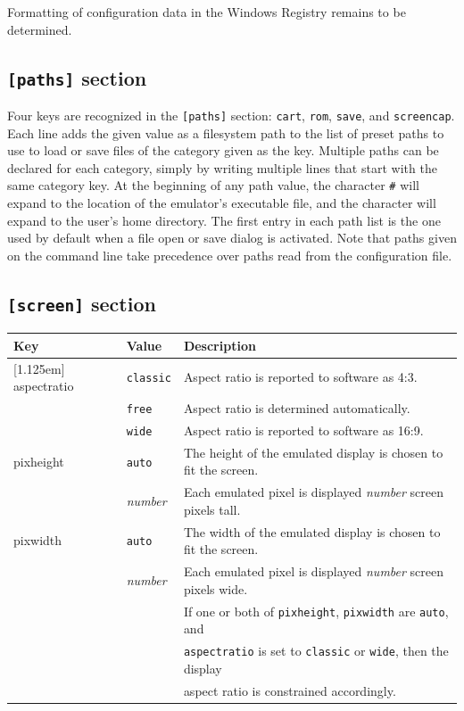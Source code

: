 \documentclass[12pt]{{memoir}}
\newcommand\Hline{%
\hline\raisebox{0pt}[1.125em]{}}
\begin{document}
Formatting of configuration data in the Windows Registry remains to be determined.

\subsection{\texttt{[paths]} section}

Four keys are recognized in the \texttt{[paths]} section: \texttt{cart}, \texttt{rom}, \texttt{save}, and \texttt{screencap}. Each line adds the given value as a filesystem path to the list of preset paths to use to load or save files of the category given as the key. Multiple paths can be declared for each category, simply by writing multiple lines that start with the same category key. At the beginning of any path value, the character \texttt{\#} will expand to the location of the emulator's executable file, and the character \texttt{\raisebox{-.25em}{\textasciitilde}} will expand to the user's home directory. The first entry in each path list is the one used by default when a file open or save dialog is activated. Note that paths given on the command line take precedence over paths read from the configuration file.

\subsection{\texttt{[screen]} section}

\begin{center}\begin{tabular}{>{\ttfamily}lll}
\textrm{Key} & Value & Description \\
\Hline
aspectratio & \texttt{classic} & Aspect ratio is reported to software as 4:3.\\
& \texttt{free} & Aspect ratio is determined automatically.\\
& \texttt{wide} & Aspect ratio is reported to software as 16:9.\\
pixheight & \texttt{auto} & The height of the emulated display is chosen to fit the screen.\\
& \textit{number} & Each emulated pixel is displayed \textit{number} screen pixels tall.\\
pixwidth & \texttt{auto} & The width of the emulated display is chosen to fit the screen.\\
& \textit{number} & Each emulated pixel is displayed \textit{number} screen pixels wide.\\
& & If one or both of \texttt{pixheight}, \texttt{pixwidth} are \texttt{auto}, and \\
& & \texttt{aspectratio} is set to \texttt{classic} or \texttt{wide}, then the display \\
& & aspect ratio is constrained accordingly.
\end{tabular}\end{center}
\end{document}
